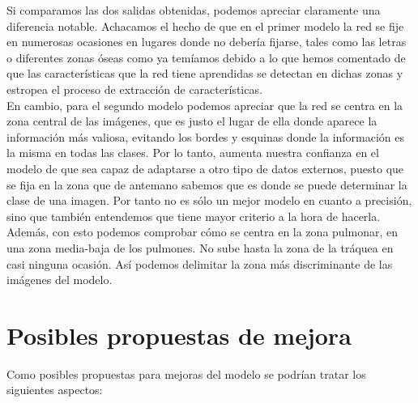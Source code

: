 \documentclass[11pt,a4paper]{article}
\theoremstyle{definition}
\begin{document}
\newpage

Si comparamos las dos salidas obtenidas, podemos apreciar claramente una diferencia notable.  Achacamos el hecho de que en el primer modelo la red se fije en numerosas ocasiones en lugares donde no debería fijarse, tales como las letras o diferentes zonas óseas como ya temíamos debido a lo que hemos comentado de que las características que la red tiene aprendidas se detectan en dichas zonas y estropea el proceso de extracción de características.\\

En cambio, para el segundo modelo podemos apreciar que la red se centra en la zona central de las imágenes, que es justo el lugar de ella donde aparece la información más valiosa, evitando los bordes y esquinas donde la información es la misma en todas las clases.  Por lo tanto, aumenta nuestra confianza en el modelo de que sea capaz de adaptarse a otro tipo de datos externos, puesto que se fija en la zona que de antemano sabemos que es donde se puede determinar la clase de una imagen.  Por tanto no es sólo un mejor modelo en cuanto a precisión, sino que también entendemos que tiene mayor criterio a la hora de hacerla. Además, con esto podemos comprobar cómo se centra en la zona pulmonar,  en una zona media-baja de los pulmones.  No sube hasta la zona de la tráquea en casi ninguna ocasión. Así podemos delimitar la zona más discriminante de las imágenes del modelo.

\section{Posibles propuestas de mejora}

Como posibles propuestas para mejoras del modelo se podrían tratar los siguientes aspectos:
\end{document}
